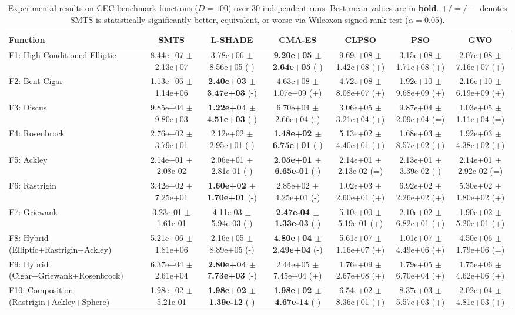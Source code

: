 \begin{table}[t]
\centering
\caption{Experimental results on CEC benchmark functions ($D = 100$) over 30 independent runs. Best mean values are in \textbf{bold}. $+/=/-$ denotes SMTS is statistically significantly better, equivalent, or worse via Wilcoxon signed-rank test ($\alpha = 0.05$).}
\label{tab:results_D100}
\scriptsize
\begin{tabular}{lcccccc}
\hline
Function & \textbf{SMTS} & \textbf{L-SHADE} & \textbf{CMA-ES} & \textbf{CLPSO} & \textbf{PSO} & \textbf{GWO} \\
\hline
F1: High-Conditioned Elliptic & 8.44e+07 $\pm$ 2.13e+07 & 3.78e+06 $\pm$ 8.56e+05 (-) & \textbf{9.20e+05 $\pm$ 2.64e+05} (-) & 9.69e+08 $\pm$ 1.42e+08 (+) & 3.15e+08 $\pm$ 1.71e+08 (+) & 2.07e+08 $\pm$ 7.16e+07 (+) \\
F2: Bent Cigar & 1.13e+06 $\pm$ 1.14e+06 & \textbf{2.40e+03 $\pm$ 3.47e+03} (-) & 4.63e+08 $\pm$ 1.07e+09 (+) & 4.72e+08 $\pm$ 8.08e+07 (+) & 1.92e+10 $\pm$ 9.68e+09 (+) & 2.16e+10 $\pm$ 6.19e+09 (+) \\
F3: Discus & 9.85e+04 $\pm$ 9.80e+03 & \textbf{1.22e+04 $\pm$ 4.51e+03} (-) & 6.70e+04 $\pm$ 2.66e+04 (-) & 3.06e+05 $\pm$ 3.21e+04 (+) & 9.87e+04 $\pm$ 2.09e+04 (=) & 1.03e+05 $\pm$ 1.11e+04 (=) \\
F4: Rosenbrock & 2.76e+02 $\pm$ 3.79e+01 & 2.12e+02 $\pm$ 2.95e+01 (-) & \textbf{1.48e+02 $\pm$ 6.75e+01} (-) & 5.13e+02 $\pm$ 4.40e+01 (+) & 1.68e+03 $\pm$ 8.57e+02 (+) & 1.92e+03 $\pm$ 4.38e+02 (+) \\
F5: Ackley & 2.14e+01 $\pm$ 2.08e-02 & 2.06e+01 $\pm$ 2.81e-01 (-) & \textbf{2.05e+01 $\pm$ 6.65e-01} (-) & 2.14e+01 $\pm$ 2.13e-02 (=) & 2.13e+01 $\pm$ 3.39e-02 (-) & 2.14e+01 $\pm$ 2.92e-02 (=) \\
F6: Rastrigin & 3.42e+02 $\pm$ 7.25e+01 & \textbf{1.60e+02 $\pm$ 1.70e+01} (-) & 2.85e+02 $\pm$ 4.25e+01 (-) & 1.02e+03 $\pm$ 2.60e+01 (+) & 6.92e+02 $\pm$ 2.26e+02 (+) & 5.30e+02 $\pm$ 1.80e+02 (+) \\
F7: Griewank & 3.23e-01 $\pm$ 1.61e-01 & 4.11e-03 $\pm$ 5.94e-03 (-) & \textbf{2.47e-04 $\pm$ 1.33e-03} (-) & 5.10e+00 $\pm$ 5.19e-01 (+) & 2.10e+02 $\pm$ 6.82e+01 (+) & 1.90e+02 $\pm$ 5.20e+01 (+) \\
F8: Hybrid (Elliptic+Rastrigin+Ackley) & 5.21e+06 $\pm$ 1.81e+06 & 2.16e+05 $\pm$ 8.89e+05 (-) & \textbf{4.80e+04 $\pm$ 2.49e+04} (-) & 5.61e+07 $\pm$ 1.16e+07 (+) & 1.01e+07 $\pm$ 4.49e+06 (+) & 4.50e+06 $\pm$ 1.79e+06 (=) \\
F9: Hybrid (Cigar+Griewank+Rosenbrock) & 6.37e+04 $\pm$ 2.61e+04 & \textbf{2.80e+04 $\pm$ 7.73e+03} (-) & 2.44e+05 $\pm$ 7.45e+04 (+) & 1.76e+09 $\pm$ 2.67e+08 (+) & 1.79e+05 $\pm$ 6.70e+04 (+) & 1.75e+06 $\pm$ 4.62e+06 (+) \\
F10: Composition (Rastrigin+Ackley+Sphere) & 1.98e+02 $\pm$ 5.21e-01 & \textbf{1.98e+02 $\pm$ 1.39e-12} (-) & \textbf{1.98e+02 $\pm$ 4.67e-14} (-) & 6.54e+02 $\pm$ 8.36e+01 (+) & 8.37e+03 $\pm$ 5.57e+03 (+) & 2.02e+04 $\pm$ 4.81e+03 (+) \\
\hline
\end{tabular}
\end{table}